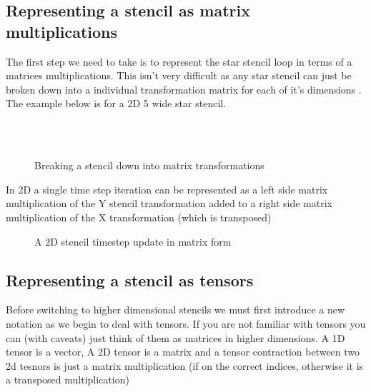 \documentclass{article}
\begin{document}
\subsection{Representing a stencil as matrix multiplications}

The first step we need to take is to represent the star stencil loop in terms of a matrices multiplications.
This isn't very difficult as any star stencil can just be broken down into a individual transformation matrix for each of it's dimensions \cite{10.1145/3524059.3532392}.
The example below is for a 2D 5 wide star stencil. \\

\begin{figure}[H]
	\begin{mdframed}[backgroundcolor=myFigureColour]
		 \\
		 \\
		
		\caption{Breaking a stencil down into matrix transformations}
	\end{mdframed}
\end{figure}

In 2D a single time step iteration can be represented as a left side matrix multiplication of the Y stencil transformation added to a right side matrix multiplication of the X transformation (which is transposed) \\

\begin{figure}[H]
	\begin{mdframed}[backgroundcolor=myFigureColour]
		
		\caption{A 2D stencil timestep update in matrix form}
		\label{stencil timestep}
	\end{mdframed}
\end{figure}

\subsection{Representing a stencil as tensors}

Before switching to higher dimensional stencils we must first introduce a new notation as we begin to deal with tensors.
If you are not familiar with tensors you can (with caveats) just think of them as matrices in higher dimensions. A 1D tensor is a vector, A 2D tensor is a matrix and a tensor contraction between two 2d tesnors is just a matrix multiplication (if on the correct indices, otherwise it is a transposed multiplication) \\
\end{document}
